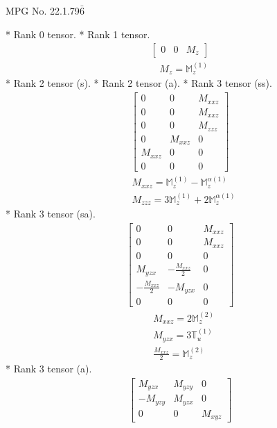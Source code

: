 \documentclass[fleqn,8pt,landscape]{jsarticle}
\begin{document}
\setcounter{MaxMatrixCols}{32}

\renewcommand{\tablename}{Table~}
\renewcommand{\figurename}{Figure~}
\begin{center}
\LARGE
MPG No. 22.1.79\quad$\bar{6}$
\end{center}
* Rank 0 tensor.
* Rank 1 tensor.
\begin{align*}
\begin{bmatrix} 0 & 0 & M_{z} \end{bmatrix}
\end{align*}
\begin{align*}
& M_{z} = \mathbb{M}_{z}^{(1)}
\end{align*}
* Rank 2 tensor (s).
* Rank 2 tensor (a).
* Rank 3 tensor (ss).
\begin{align*}
\begin{bmatrix} 0 & 0 & M_{xxz} \\ 0 & 0 & M_{xxz} \\ 0 & 0 & M_{zzz} \\ 0 & M_{xxz} & 0 \\ M_{xxz} & 0 & 0 \\ 0 & 0 & 0 \end{bmatrix}
\end{align*}
\begin{align*}
& M_{xxz} = \mathbb{M}_{z}^{(1)} - \mathbb{M}_{z}^{\alpha(1)} \\
& M_{zzz} = 3 \mathbb{M}_{z}^{(1)} + 2 \mathbb{M}_{z}^{\alpha(1)}
\end{align*}
* Rank 3 tensor (sa).
\begin{align*}
\begin{bmatrix} 0 & 0 & M_{xxz} \\ 0 & 0 & M_{xxz} \\ 0 & 0 & 0 \\ M_{yzx} & - \frac{M_{xxz}}{2} & 0 \\ - \frac{M_{xxz}}{2} & - M_{yzx} & 0 \\ 0 & 0 & 0 \end{bmatrix}
\end{align*}
\begin{align*}
& M_{xxz} = 2 \mathbb{M}_{z}^{(2)} \\
& M_{yzx} = 3 \mathbb{T}_{u}^{(1)} \\
& \frac{M_{xxz}}{2} = \mathbb{M}_{z}^{(2)}
\end{align*}
* Rank 3 tensor (a).
\begin{align*}
\begin{bmatrix} M_{yzx} & M_{yzy} & 0 \\ - M_{yzy} & M_{yzx} & 0 \\ 0 & 0 & M_{xyz} \end{bmatrix}
\end{align*}
\end{document}
